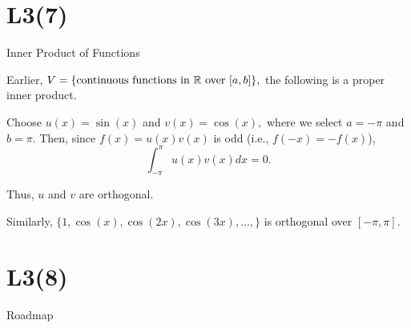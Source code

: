 \documentclass[handout,fleqn,aspectratio=169]{beamer}
\begin{document}
\section{L3(7)}
\begin{frame}{Inner Product of Functions}

\plitemsep 0.2in

\bci 

\item Earlier, $V=\{\text{continuous functions in ${\mathbb R}$ over $[a,b]$} \},$ the following is a proper inner product. 

\item \exam Choose $u(x) = \sin(x)$ and $v(x)= \cos(x),$ where we select $a=-\pi$ and $b=\pi.$ Then, since $f(x) = u(x)v(x)$ is odd (i.e., $f(-x) = -f(x)$), 
$$
\int_{-\pi}^\pi u(x) v(x) dx =0.
$$

\item Thus, $u$ and $v$ are orthogonal. 

\item Similarly, $\{1, \cos(x), \cos(2x), \cos(3x), \ldots,  \}$ is orthogonal over $[-\pi,\pi].$
\eci


\end{frame}



\section{L3(8)}
\begin{frame}{Roadmap}

\plitemsep 0.1in

\bce[(1)] 
\item {}

\item {}

\item {}

\ece
\end{frame}
\end{document}
